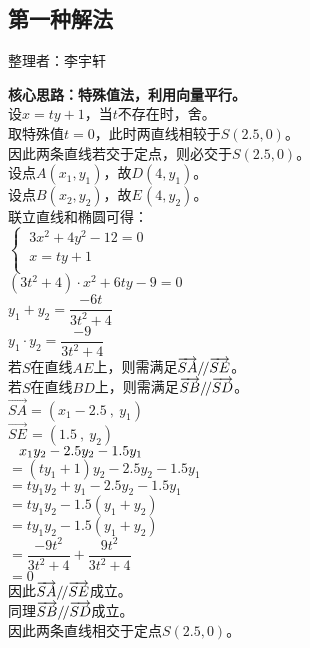 \documentclass[UTF8]{ctexart}
\renewcommand\parallel{{\mathrel{/\mskip-2.5mu/}}}
\begin{document}
\subsection{第一种解法}
    \begin{center}
        整理者：李宇轩
    \end{center}
    \begin{multicols}{2}
        \small
        \textbf{核心思路：特殊值法，利用向量平行。}\\[5mm]
        设$x=ty+1$，当$t$不存在时，舍。\\[4mm]
        取特殊值$t=0$，此时两直线相较于$S(2.5,0)$。\\[4mm]
        因此两条直线若交于定点，则必交于$S(2.5,0)$。\\[8mm]
        设点$A(x_1,y_1)$，故$D(4,y_1)$。\\[5mm]
        设点$B(x_2,y_2)$\hspace{1.5pt}，故$E\hspace{1pt}(4,y_2)$。\\[5mm]
        联立直线和椭圆可得：\\[5mm]
        \begin{math}
            \begin{cases}
                ~3x^2+4y^2-12=0\\[1mm]
                ~x=ty+1\\[1mm]
            \end{cases}
        \end{math}\\[5mm]
        $(3t^2+4)\cdot x^2+6ty-9=0$\\[5mm]
        $y_1+y_2=\dfrac{-6t}{3t^2+4}$\\[5mm]
        $y_1\cdot y_2=\dfrac{-9}{3t^2+4}$\\[5mm]
        若$S$在直线$AE$上，则需满足$\overrightarrow{SA}\parallel\overrightarrow{SE}$。\\[5mm]
        若$S$在直线$BD$上，则需满足$\overrightarrow{SB}\parallel\overrightarrow{SD}$。\\[5mm]
        $\overrightarrow{SA}=(x_1-2.5~,~y_1)$\\[5mm]
        $\overrightarrow{SE}\hspace{1pt}=(1.5~,~y_2)$\\[100mm]
        $\hphantom{=}x_1y_2-2.5y_2-1.5y_1$\\[5mm]
        $=(ty_1+1)y_2-2.5y_2-1.5y_1$\\[5mm]
        $=ty_1y_2+y_1-2.5y_2-1.5y_1$\\[5mm]
        $=ty_1y_2-1.5(y_1+y_2)$\\[5mm]
        $=ty_1y_2-1.5(y_1+y_2)$\\[5mm]
        $=\dfrac{-9t^2}{3t^2+4}+\dfrac{9t^2}{3t^2+4}$\\[5mm]
        $=0$\\[8mm]
        因此$\overrightarrow{SA}\parallel\overrightarrow{SE}$成立。\\[5mm]
        同理$\overrightarrow{SB}\parallel\overrightarrow{SD}$成立。\\[5mm]
        因此两条直线相交于定点$S(2.5,0)$。
        \newpage
    \end{multicols}
\end{document}
